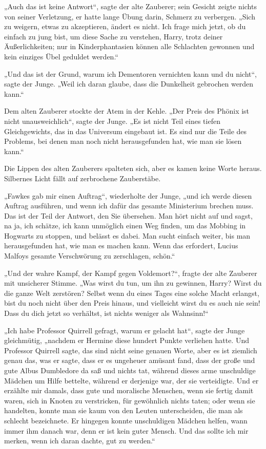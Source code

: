 {„Auch das ist keine Antwort“, sagte der alte Zauberer; sein Gesicht zeigte nichts von seiner Verletzung, er hatte lange Übung darin, Schmerz zu verbergen. „Sich zu weigern, etwas zu akzeptieren, ändert es nicht. Ich frage mich jetzt, ob du einfach zu jung bist, um diese Sache zu verstehen, Harry, trotz deiner Äußerlichkeiten; nur in Kinderphantasien können alle Schlachten gewonnen und kein einziges Übel geduldet werden.“

„Und das ist der Grund, warum ich Dementoren vernichten kann und du nicht“, sagte der Junge. „Weil ich daran glaube, dass die Dunkelheit gebrochen werden kann.“

Dem alten Zauberer stockte der Atem in der Kehle. „Der Preis des Phönix ist nicht unausweichlich“, sagte der Junge. „Es ist nicht Teil eines tiefen Gleichgewichts, das in das Universum eingebaut ist. Es sind nur die Teile des Problems, bei denen man noch nicht herausgefunden hat, wie man sie lösen kann.“

Die Lippen des alten Zauberers spalteten sich, aber es kamen keine Worte heraus. Silbernes Licht fällt auf zerbrochene Zauberstäbe.

„Fawkes gab mir einen Auftrag“, wiederholte der Junge, „und ich werde diesen Auftrag ausführen, und wenn ich dafür das gesamte Ministerium brechen muss. Das ist der Teil der Antwort, den Sie übersehen. Man hört nicht auf und sagst, na ja, ich schätze, ich kann unmöglich einen Weg finden, um das Mobbing in Hogwarts zu stoppen, und belässt es dabei. Man sucht einfach weiter, bis man herausgefunden hat, wie man es machen kann. Wenn das erfordert, Lucius Malfoys gesamte Verschwörung zu zerschlagen, schön.“

„Und der wahre Kampf, der Kampf gegen Voldemort?“, fragte der alte Zauberer mit unsicherer Stimme. „Was wirst du tun, um ihn zu gewinnen, Harry? Wirst du die ganze Welt zerstören? Selbst wenn du eines Tages eine solche Macht erlangst, bist du noch nicht über den Preis hinaus, und vielleicht wirst du es auch nie sein! Dass du dich jetzt so verhältst, ist nichts weniger als Wahnsinn!“

„Ich habe Professor Quirrell gefragt, warum er gelacht hat“, sagte der Junge gleichmütig, „nachdem er Hermine diese hundert Punkte verliehen hatte. Und Professor Quirrell sagte, das sind nicht seine genauen Worte, aber es ist ziemlich genau das, was er sagte, dass er es ungeheuer amüsant fand, dass der große und gute Albus Dumbledore da saß und nichts tat, während dieses arme unschuldige Mädchen um Hilfe bettelte, während er derjenige war, der sie verteidigte. Und er erzählte mir damals, dass gute und moralische Menschen, wenn sie fertig damit waren, sich in Knoten zu verstricken, für gewöhnlich nichts taten; oder wenn sie handelten, konnte man sie kaum von den Leuten unterscheiden, die man als schlecht bezeichnete. Er hingegen konnte unschuldigen Mädchen helfen, wann immer ihm danach war, denn er ist kein guter Mensch. Und das sollte ich mir merken, wenn ich daran dachte, gut zu werden.“

}
